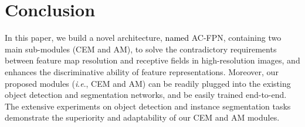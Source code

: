 \documentclass[journal]{IEEEtran}
\newcommand{\ie}{\textit{i}.\textit{e}.\xspace}
\def\myblue{\textcolor{black}}
\begin{document}
	
	


	\section{Conclusion}
	


	In this paper, we build a novel architecture, \myblue{named} AC-FPN, containing two main sub-modules (CEM and AM), to solve the contradictory requirements between feature map resolution and receptive fields in high-resolution images, and enhances the discriminative ability of feature representations.
Moreover, our proposed modules (\ie, CEM and AM) can be readily plugged into the existing object detection and segmentation networks, and be easily trained end-to-end.
	The extensive experiments on object detection and instance segmentation tasks demonstrate the superiority and adaptability of our CEM and AM modules.
	



	
	
\end{document}
